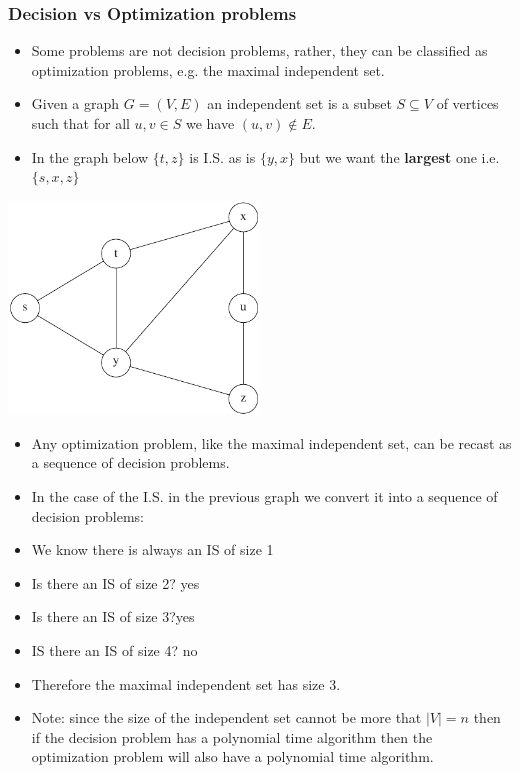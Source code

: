 \documentclass{beamer}
\begin{document}
\begin{frame}
  \frametitle{Decision vs Optimization problems}
  \begin{itemize}
  \item Some problems are not decision problems, rather, they can be classified as optimization problems, e.g.  the maximal independent set. 
  \item Given a graph $G=(V,E)$ an independent set is a subset $S\subseteq V$ of vertices such that for all $u,v\in S$ we have $(u,v)\notin E$.
  \item In the graph below $\{t,z\}$ is I.S. as is  $\{y,x\}$ but we want the \textbf{largest} one i.e.  $\{s,x,z\}$
  \end{itemize}
\includegraphics[width=0.5\textwidth]{np-figs/independent}

\end{frame}


\begin{frame}
  \begin{itemize}
  \item Any optimization problem, like the maximal independent set, can be recast as a sequence of decision problems.
  \item In the case of the I.S. in the previous graph we convert it into a sequence of decision problems:
  \item We know there is always an IS of size 1
 \item Is there an IS of size 2? yes
  \item Is there an IS of size 3?yes
 \item IS there an IS of size 4? no
  \item Therefore the maximal independent set has size 3.
\item Note: since the size of the independent set cannot be more that $|V|=n$ then if the decision problem has a polynomial time algorithm then the optimization problem will also have a polynomial time algorithm.
  
  \end{itemize}
\end{frame}
\end{document}
